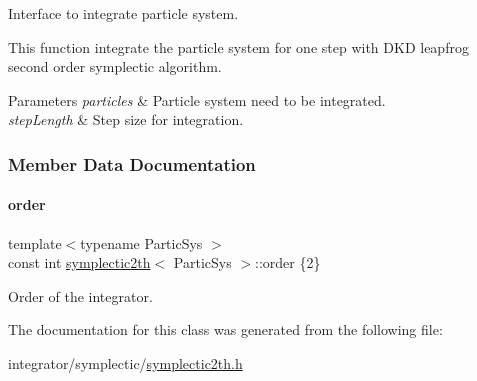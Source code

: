 Interface to integrate particle system. 

This function integrate the particle system for one step with D\+KD leapfrog second order symplectic algorithm. 
\begin{DoxyParams}{Parameters}
{\em particles} & Particle system need to be integrated. \\
\hline
{\em step\+Length} & Step size for integration. \\
\hline
\end{DoxyParams}


\subsubsection{Member Data Documentation}
\mbox{\label{classsymplectic2th_a1082d668c1081ff0116e8816f1240fcd}} 
\paragraph{\texorpdfstring{order}{order}}
{\footnotesize\ttfamily template$<$typename Partic\+Sys $>$ \\
const int \mbox{\hyperlink{classsymplectic2th}{symplectic2th}}$<$ Partic\+Sys $>$\+::order \{2\}\hspace{0.3cm}{\ttfamily [static]}}



Order of the integrator. 



The documentation for this class was generated from the following file\+:\begin{DoxyCompactItemize}
\item 
integrator/symplectic/\mbox{\hyperlink{symplectic2th_8h}{symplectic2th.\+h}}\end{DoxyCompactItemize}
